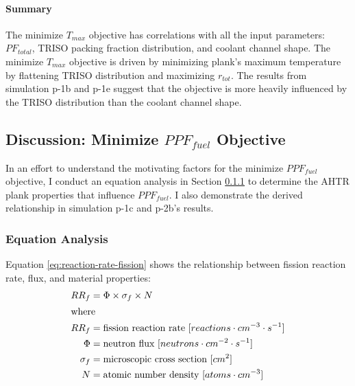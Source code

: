 \paragraph{Summary}
The minimize $T_{max}$ objective has correlations with all the input parameters: 
$PF_{total}$, TRISO packing fraction distribution, and coolant channel shape. 
The minimize $T_{max}$ objective is driven by minimizing plank's maximum temperature 
by flattening TRISO distribution and maximizing $r_{tot}$. 
The results from simulation p-1b and p-1e suggest that the objective is more heavily 
influenced by the TRISO distribution than the coolant channel shape. 

\subsection{Discussion: Minimize $PPF_{fuel}$ Objective}
\label{sec:plank-discussion-ppf}
In an effort to understand the motivating factors for the minimize $PPF_{fuel}$ 
objective, I conduct an equation analysis in Section
\ref{sec:plank-discussion-ppf-equation} to determine the \gls{AHTR} plank properties 
that influence $PPF_{fuel}$. 
I also demonstrate the derived relationship in simulation p-1c and p-2b's results. 

\subsubsection{Equation Analysis}
\label{sec:plank-discussion-ppf-equation}
Equation \ref{eq:reaction-rate-fission} shows the relationship between fission reaction 
rate, flux, and material properties: 
\begin{align}
\label{eq:reaction-rate-fission}
    RR_f &= \Phi \times \sigma_f \times N \\
\intertext{where}
    RR_f &= \mbox{fission reaction rate } [reactions \cdot cm^{-3} \cdot s^{-1}] \nonumber \\
    \Phi &= \mbox{neutron flux } [neutrons \cdot cm^{-2} \cdot s^{-1}] \nonumber \\
    \sigma_f &= \mbox{microscopic cross section } [cm^2] \nonumber \\
    N &= \mbox{atomic number density } [atoms \cdot cm^{-3}] \nonumber 
\end{align}

